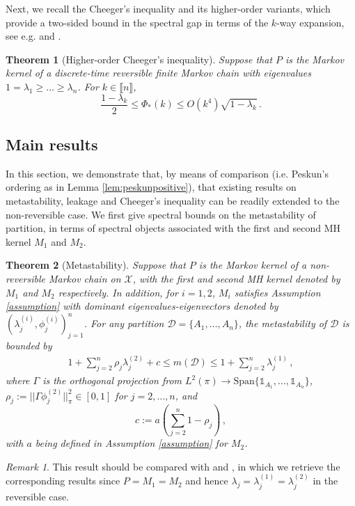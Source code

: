 \documentclass[12pt,a4]{amsart}
\numberwithin{equation}{section}
\theoremstyle{plain}
\newtheorem{theorem}{Theorem}[section]
\theoremstyle{definition}
\theoremstyle{remark}
\newtheorem{rk}{Remark}[section]
\newcommand{\1}{\mathds{1}}
\renewcommand{\leq}{\leqslant}
\renewcommand{\geq}{\geqslant}
\begin{document}
Next, we recall the Cheeger's inequality and its higher-order variants, which provide a two-sided bound in the spectral gap in terms of the $k$-way expansion, see e.g. \cite{LGT12} and \cite[Proposition $5$]{M15} .

\begin{theorem}[Higher-order Cheeger's inequality]\label{thm:revCheeger}
	Suppose that $P$ is the Markov kernel of a discrete-time reversible finite Markov chain with eigenvalues $1 = \lambda_1 \geq \ldots \geq \lambda_n$. For $k \in \llbracket n \rrbracket$,
	$$\dfrac{1-\lambda_k}{2} \leq \Phi_*(k) \leq O(k^4) \sqrt{1-\lambda_k}\,.$$
\end{theorem}

\subsection{Main results}

In this section, we demonstrate that, by means of comparison (i.e. Peskun's ordering as in Lemma \ref{lem:peskunpositive}), that existing results on metastability, leakage and Cheeger's inequality can be readily extended to the non-reversible case. We  first give spectral bounds on the metastability of partition, in terms of spectral objects associated with the first and second MH kernel $M_1$ and $M_2$.

\begin{theorem}[Metastability]\label{thm:mainMH}
	Suppose that $P$ is the Markov kernel of a non-reversible Markov chain on $\mathcal{X}$, with the first and second MH kernel denoted by $M_1$ and $M_2$ respectively. In addition, for $i = 1,2$, $M_i$ satisfies Assumption \ref{assumption} with dominant eigenvalues-eigenvectors denoted by $(\lambda_j^{(i)}, \phi_j^{(i)})_{j=1}^n$. For any partition $\mathcal{D} = \{A_1,\ldots,A_n\}$, the metastability of $\mathcal{D}$ is bounded by 
	\begin{align}\label{eq:mainMH}
	1 + \sum_{j=2}^n \rho_j \lambda_j^{(2)} + c \leq m(\mathcal{D}) \leq 
	1 + \sum_{j=2}^n \lambda_j^{(1)}\,,
	\end{align}
	where $\Gamma$ is the orthogonal projection from $L^2(\pi) \to \mathrm{Span}\{\1_{A_1},\ldots,\1_{A_n}\}$, $\rho_j := ||\Gamma \phi_j^{(2)}||_{\pi}^2 \in [0,1]$ for $j = 2,\ldots,n$, and 
	$$c := a \left(\sum_{j=2}^n 1-\rho_j \right)\,,$$
	with $a$ being defined in Assumption \ref{assumption} for $M_2$.
\end{theorem}

\begin{rk}
	This result should be compared with \cite[Theorem $2$]{HS06} and \cite[Theorem $5.8$]{SS13}, in which we retrieve the corresponding results since $P = M_1 = M_2$ and hence $\lambda_j = \lambda_j^{(1)} = \lambda_j^{(2)}$ in the reversible case. 
\end{rk}
\end{document}

